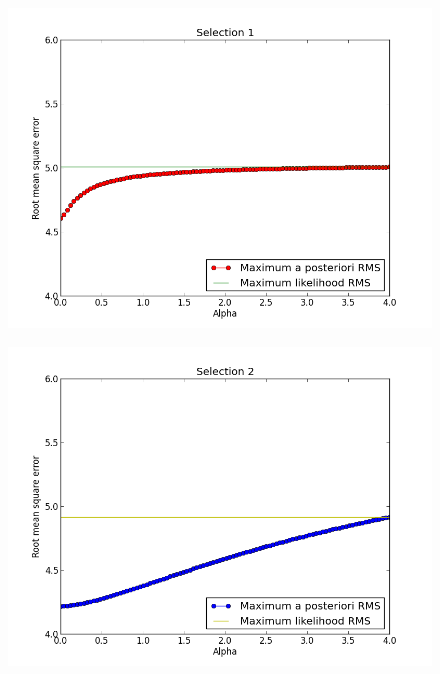 \documentclass[11pt,a4paper]{article}
\begin{document}
\begin{figure}[h!]
    \includegraphics[width=\textwidth]{images/prob12-sel1.png}
\end{figure}
\begin{figure}[h!]
    \includegraphics[width=\textwidth]{images/prob12-sel2.png}
\end{figure}
\end{document}
